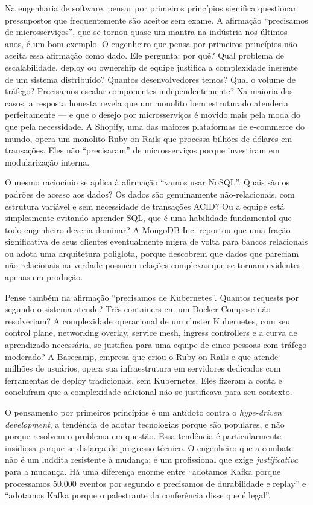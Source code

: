 Na engenharia de software, pensar por primeiros princípios significa
questionar pressupostos que frequentemente são aceitos sem exame.
A afirmação ``precisamos de microsserviços'', que se tornou quase um
mantra na indústria nos últimos anos, é um bom exemplo. O engenheiro que
pensa por primeiros princípios não aceita essa afirmação como dado. Ele
pergunta: por quê? Qual problema de escalabilidade, deploy ou ownership
de equipe justifica a complexidade inerente de um sistema distribuído?
Quantos desenvolvedores temos? Qual o volume de tráfego? Precisamos
escalar componentes independentemente? Na maioria dos casos, a resposta
honesta revela que um monolito bem estruturado atenderia perfeitamente
--- e que o desejo por microsserviços é movido mais pela moda do que
pela necessidade. A Shopify, uma das maiores plataformas de e-commerce
do mundo, opera um monolito Ruby on Rails que processa bilhões de
dólares em transações. Eles não ``precisaram'' de microsserviços porque
investiram em modularização interna.

O mesmo raciocínio se aplica à afirmação ``vamos usar NoSQL''. Quais são
os padrões de acesso aos dados? Os dados são genuinamente não-relacionais,
com estrutura variável e sem necessidade de transações ACID? Ou a equipe
está simplesmente evitando aprender SQL, que é uma habilidade fundamental
que todo engenheiro deveria dominar? A MongoDB Inc. reportou que uma
fração significativa de seus clientes eventualmente migra de volta para
bancos relacionais ou adota uma arquitetura poliglota, porque descobrem
que dados que pareciam não-relacionais na verdade possuem relações
complexas que se tornam evidentes apenas em produção.

Pense também na afirmação ``precisamos de Kubernetes''. Quantos requests
por segundo o sistema atende? Três containers em um Docker Compose não
resolveriam? A complexidade operacional de um cluster Kubernetes, com
seu control plane, networking overlay, service mesh, ingress controllers
e a curva de aprendizado necessária, se justifica para uma equipe de
cinco pessoas com tráfego moderado? A Basecamp, empresa que criou o Ruby
on Rails e que atende milhões de usuários, opera sua infraestrutura em
servidores dedicados com ferramentas de deploy tradicionais, sem
Kubernetes. Eles fizeram a conta e concluíram que a complexidade
adicional não se justificava para seu contexto.

O pensamento por primeiros princípios é um antídoto contra o \emph{hype-driven
development}, a tendência de adotar tecnologias porque são populares, e
não porque resolvem o problema em questão. Essa tendência é particularmente
insidiosa porque se disfarça de progresso técnico. O engenheiro que a combate
não é um luddita resistente à mudança; é um profissional que exige
\emph{justificativa} para a mudança. Há uma diferença enorme entre ``adotamos
Kafka porque processamos 50.000 eventos por segundo e precisamos de
durabilidade e replay'' e ``adotamos Kafka porque o palestrante da conferência
disse que é legal''.

